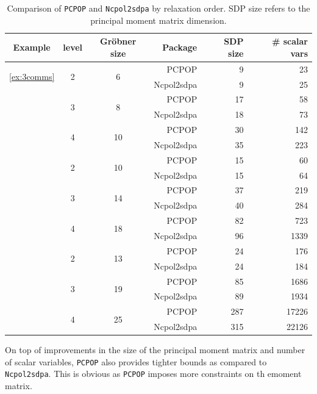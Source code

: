 \begin{table}[H]
	\centering
	\caption{Comparison of \texttt{PCPOP} and \texttt{Ncpol2sdpa} by relaxation order. SDP size refers to the principal moment matrix dimension.}
	\label{tab:compare-pcpop-ncpol}
	\begin{tabular}{@{}cccrrr@{}}
		\toprule
		Example & level & Gr\"obner size & Package & SDP size & \# scalar vars \\
		\midrule
		\multirow{2}{*}{\ref{ex:3comms}} & \multirow{2}{*}{2} & \multirow{2}{*}{6} & PCPOP      & 9 & 23 \\
		                           &                    &                      & Ncpol2sdpa & 9 & 25 \\
		\addlinespace
		\multirow{2}{*}{\ref{ex:3comms}} & \multirow{2}{*}{3} & \multirow{2}{*}{8} & PCPOP      & 17 & 58 \\
		                           &                    &                      & Ncpol2sdpa & 18 & 73 \\
		\addlinespace
        \multirow{2}{*}{\ref{ex:3comms}} & \multirow{2}{*}{4} & \multirow{2}{*}{10} & PCPOP      & 30 & 142 \\
		                           &                    &                      & Ncpol2sdpa & 35 & 223 \\
		\addlinespace

		\multirow{2}{*}{\ref{ex:4comms}} & \multirow{2}{*}{2} & \multirow{2}{*}{10} & PCPOP      & 15 & 60 \\
		                           &                    &                      & Ncpol2sdpa & 15 & 64 \\
		\addlinespace
		\multirow{2}{*}{\ref{ex:4comms}} & \multirow{2}{*}{3} & \multirow{2}{*}{14} & PCPOP      & 37 & 219 \\
		                           &                    &                      & Ncpol2sdpa & 40 & 284 \\
		\addlinespace
        \multirow{2}{*}{\ref{ex:4comms}} & \multirow{2}{*}{4} & \multirow{2}{*}{18} & PCPOP      & 82 & 723 \\
		                           &                    &                      & Ncpol2sdpa & 96 & 1339 \\
		\addlinespace
		\multirow{2}{*}{\ref{ex:5comms}} & \multirow{2}{*}{2} & \multirow{2}{*}{13} & PCPOP      & 24 & 176 \\
		                           &                    &                      & Ncpol2sdpa & 24 & 184 \\
		\addlinespace
		\multirow{2}{*}{\ref{ex:5comms}} & \multirow{2}{*}{3} & \multirow{2}{*}{19} & PCPOP      & 85 & 1686 \\
		                           &                    &                      & Ncpol2sdpa & 89 & 1934 \\
		\addlinespace
		\multirow{2}{*}{\ref{ex:5comms}} & \multirow{2}{*}{4} & \multirow{2}{*}{25} & PCPOP      & 287 & 17226 \\
		                           &                    &                      & Ncpol2sdpa & 315 & 22126 \\
		\bottomrule
	\end{tabular}
\end{table}
On top of improvements in the size of the principal moment matrix and number of scalar variables, \texttt{PCPOP} also provides tighter bounds as compared to \texttt{Ncpol2sdpa}. This is obvious as \texttt{PCPOP} imposes more constraints on th emoment matrix.

